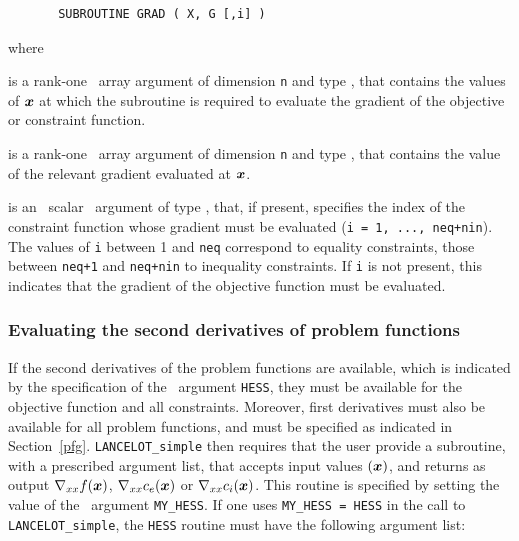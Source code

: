 \documentclass{galahad}
\begin{document}
\def\baselinestretch{0.8}
{\tt \begin{verbatim}
       SUBROUTINE GRAD ( X, G [,i] )
\end{verbatim} }
\def\baselinestretch{1.0}
\noindent
where
\begin{description}
 is a rank-one \intentin\ array argument of
dimension {\tt n} and type \realdp,
that contains the values of ${\bm{x}}$ at which the
subroutine is required to evaluate the gradient
of the objective or constraint function.

 is a rank-one \intentout\ array argument of dimension {\tt n}  and
  type \realdp, that contains the value of the relevant
  gradient evaluated at ${\bm{x}}$.

 is an \optional\ scalar \intentin\ argument of type \integer,
that, if present, specifies the index of the constraint function whose
gradient must be evaluated  ({\tt i = 1, ..., neq+nin}).  The values of {\tt i}
between 1 and {\tt neq} correspond to equality constraints, those between
{\tt neq+1} and {\tt neq+nin} to inequality constraints. If {\tt i} is not
present, this indicates that the gradient of the objective function must be
evaluated.
\end{description}

\subsubsection{Evaluating the second derivatives of problem
functions\label{pfh}}

If the second derivatives of the problem functions are available, which is
indicated by the specification of the \optional\ argument {\tt HESS}, they must
be available for the objective function and all constraints. Moreover, first
derivatives must also be available for all problem functions, and must be
specified as indicated in Section~\ref{pfg}.
{\tt LANCELOT\_simple} then requires that the user provide a subroutine, with
a prescribed argument list, that accepts input values $({\bm{x}})$, and returns as
output  $\nabla_{xx}f({\bm{x}})$,  $\nabla_{xx}c_e({\bm{x}})$ or
$\nabla_{xx}c_i({\bm{x}})$. This routine is specified by setting the value of the
\optional\ argument {\tt MY\_HESS}. If one uses {\tt MY\_HESS = HESS} in the
call to {\tt LANCELOT\_simple}, the {\tt HESS} routine must have the following
argument list:
\end{document}
